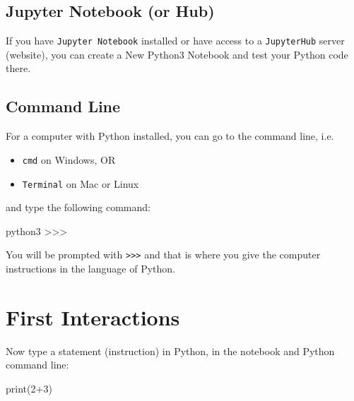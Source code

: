 \documentclass[
  letterpaper,
]{scrbook}
\newenvironment{Shaded}{\begin{snugshade}}{\end{snugshade}}
\newcommand{\BuiltInTok}[1]{\textcolor[rgb]{0.00,0.23,0.31}{#1}}
\newcommand{\DecValTok}[1]{\textcolor[rgb]{0.68,0.00,0.00}{#1}}
\newcommand{\NormalTok}[1]{\textcolor[rgb]{0.00,0.23,0.31}{#1}}
\newcommand{\OperatorTok}[1]{\textcolor[rgb]{0.37,0.37,0.37}{#1}}
\providecommand{\tightlist}{%
  \setlength{\itemsep}{0pt}\setlength{\parskip}{0pt}}
\begin{document}

\subsection*{Jupyter Notebook (or Hub)}\label{jupyter-notebook-or-hub}

If you have \texttt{Jupyter\ Notebook} installed or have access to a
\texttt{JupyterHub} server (website), you can create a New Python3
Notebook and test your Python code there.

\subsection*{Command Line}\label{command-line}

For a computer with Python installed, you can go to the command line,
i.e.~

\begin{itemize}
\tightlist
\item
  \texttt{cmd} on Windows, OR
\item
  \texttt{Terminal} on Mac or Linux
\end{itemize}

and type the following command:

\begin{Shaded}
\begin{Highlighting}[]
\NormalTok{python3}
\NormalTok{\textgreater{}\textgreater{}\textgreater{}}
\end{Highlighting}
\end{Shaded}

You will be prompted with
\texttt{\textgreater{}\textgreater{}\textgreater{}} and that is where
you give the computer instructions in the language of Python.

\section*{First Interactions}\label{first-interactions}


Now type a statement (instruction) in Python, in the notebook and Python
command line:

\begin{Shaded}
\begin{Highlighting}[]
\BuiltInTok{print}\NormalTok{(}\DecValTok{2}\OperatorTok{+}\DecValTok{3}\NormalTok{)}
\end{Highlighting}
\end{Shaded}
\end{document}
